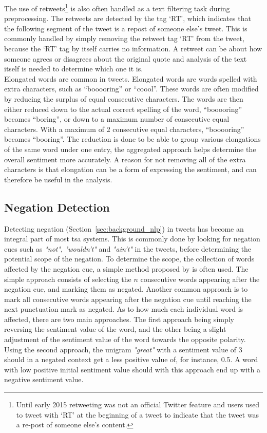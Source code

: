 The use of retweets\footnote{Until early 2015 retweeting was not an official Twitter feature and users used to tweet with `RT' at the beginning of a tweet to indicate that the tweet was a re-post of someone else's content.} is also often handled as a text filtering task during preprocessing. The retweets are detected by the tag `RT', which indicates that the following segment of the tweet is a repost of someone else's tweet. This is commonly handled by simply removing the retweet tag `RT' from the tweet, because the `RT' tag by itself carries no information. A retweet can be about how someone agrees or disagrees about the original quote and analysis of the text itself is needed to determine which one it is. \\

Elongated words are common in tweets. Elongated words are words spelled with extra characters, such as ``booooring'' or ``coool''. These words are often modified by reducing the surplus of equal consecutive characters. The words are then either reduced down to the actual correct spelling of the word, ``booooring'' becomes ``boring'', or down to a maximum number of consecutive equal characters. With a maximum of 2 consecutive equal characters, ``booooring'' becomes ``booring''. The reduction is done to be able to group various elongations of the same word under one entry, the aggregated approach helps determine the overall sentiment more accurately. A reason for not removing all of the extra characters is that elongation can be a form of expressing the sentiment, and can therefore be useful in the analysis. \\


\subsection*{Negation Detection}
Detecting negation (Section~\ref{sec:background_nlp}) in tweets has become an integral part of most \ac{tsa} systems. This is commonly done by looking for negation cues such as \textit{"not"}, \textit{"wouldn't"} and \textit{"ain't"} in the tweets, before determining the potential scope of the negation. To determine the scope, the collection of words affected by the negation cue, a simple method proposed by \cite{Das01yahoo} is often used. The simple approach consists of selecting the $n$ consecutive words appearing after the negation cue, and marking them as negated. Another common approach is to mark all consecutive words appearing after the negation cue until reaching the next punctuation mark as negated. As to how much each individual word is affected, there are two main approaches. The first approach being simply reversing the sentiment value of the word, and the other being a slight adjustment of the sentiment value of the word towards the opposite polarity. Using the second approach, the unigram \textit{"great"} with a sentiment value of 3 should in a negated context get a less positive value of, for instance, 0.5. A word with low positive initial sentiment value should with this approach end up with a negative sentiment value.


